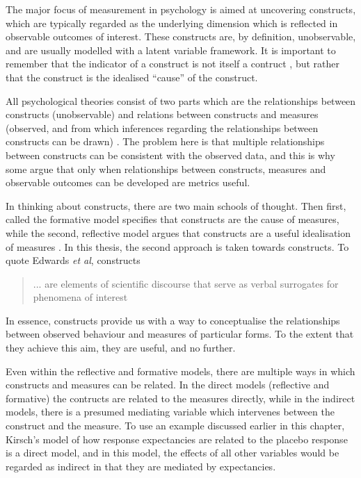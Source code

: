 The major focus of measurement in psychology is aimed at uncovering constructs, which are typically regarded as the underlying dimension which is reflected in observable outcomes of interest. These constructs are, by definition, unobservable, and are usually modelled with a latent variable framework. It is important to remember that the indicator of a construct is not itself a contruct \cite{borsboom2006attack}, but rather that the construct is the idealised ``cause'' of the construct. 

All psychological theories consist of two parts which are the relationships between constructs (unobservable) and relations between constructs and measures (observed, and from which inferences regarding the relationships between constructs can be drawn) \cite{edwards2000nature}. The problem here is that multiple relationships between constructs can be consistent with the observed data, and this is why some argue that only when relationships between constructs, measures and observable outcomes can be developed are metrics useful. 

In thinking about constructs, there are two main schools of thought. Then first, called the formative model specifies that constructs are the cause of measures, while the second, reflective model argues that constructs are a useful idealisation of measures \cite{edwards2000nature}. In this thesis, the second approach is taken towards constructs.  To quote Edwards \textit{et al}, constructs 
\begin{quotation}
  ... are elements of scientific discourse that serve as verbal surrogates for phenomena of interest
\end{quotation}

In essence, constructs provide us with a way to conceptualise the relationships between observed behaviour and measures of particular forms. To the extent that they achieve this aim, they are useful, and no further. 

Even within the reflective and formative models, there are multiple ways in which constructs and measures can be related. In the direct models (reflective and formative) the contructs are related to the measures directly, while in the indirect models, there is a presumed mediating variable which intervenes between the construct and the measure. To use an example discussed earlier in this chapter, Kirsch's model of how response expectancies are related to the placebo response is a direct model, and in this model, the effects of all other variables would be regarded as indirect in that they are mediated by expectancies. 

